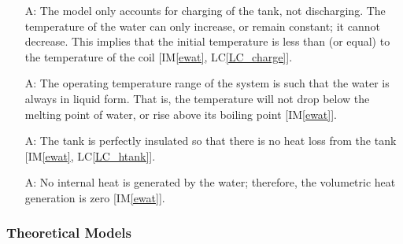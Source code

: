 \documentclass[12pt]{article}
\newcounter{assumpnum} %
\newcommand{\aref}[1]{A\ref{#1}}
\newcommand{\iref}[1]{IM\ref{#1}}
\newcommand{\lcref}[1]{LC\ref{#1}}
\begin{document}
\begin{itemize}
\item[A\refstepcounter{assumpnum}\theassumpnum \label{A_charge}:] The model only
  accounts for charging of the tank, not discharging.  The temperature of the
  water 
can only increase, or remain constant; it cannot decrease.
  This implies that the initial temperature %
  is less than (or
  equal) to the temperature of the coil [\iref{ewat}, \lcref{LC_charge}].



\item[A\refstepcounter{assumpnum}\theassumpnum \label{A_OpRange}:] The operating
  temperature range of the system is such that the water is always in liquid
  form.  That is, the temperature will not drop below the melting point of water, or rise
  above its boiling point [\iref{ewat}].%

\item[A\refstepcounter{assumpnum}\theassumpnum \label{A_htank}:] The tank is
  perfectly insulated so that there is no heat loss from the tank [\iref{ewat},
  \lcref{LC_htank}].

\item[A\refstepcounter{assumpnum}\theassumpnum \label{A_int_heat}:] No internal
  heat is generated by the water;
therefore, the volumetric
  heat generation is zero [\iref{ewat}].%
	

	
\end{itemize}

\subsubsection{Theoretical Models}\label{sec_theoretical}
\end{document}
